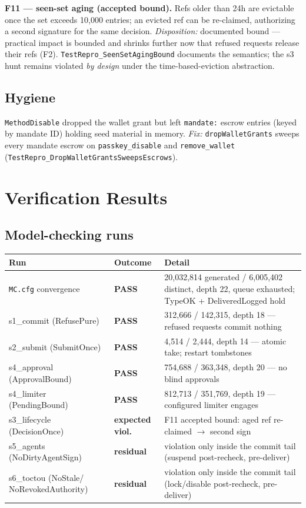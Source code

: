 \documentclass[11pt]{article}
\newcommand{\code}[1]{\texttt{#1}}
\begin{document}
\textbf{F11 — seen-set aging (accepted bound).} Refs older than 24h are
evictable once the set exceeds 10{,}000 entries; an evicted ref can be
re-claimed, authorizing a second signature for the same decision.
\emph{Disposition:} documented bound — practical impact is bounded and
shrinks further now that refused requests release their refs (F2).
\code{TestRepro\_SeenSetAgingBound} documents the semantics; the s3 hunt
remains violated \emph{by design} under the time-based-eviction abstraction.

\subsection{Hygiene}

\code{MethodDisable} dropped the wallet grant but left \code{mandate:} escrow
entries (keyed by mandate ID) holding seed material in memory. \emph{Fix:}
\code{dropWalletGrants} sweeps every mandate escrow on \code{passkey\_disable}
and \code{remove\_wallet}
(\code{TestRepro\_DropWalletGrantsSweepsEscrows}).

\section{Verification Results}

\subsection{Model-checking runs}

\begin{longtable}{@{}p{}p{}p{}@{}}
\toprule
\textbf{Run} & \textbf{Outcome} & \textbf{Detail} \\
\midrule
\endhead
\code{MC.cfg} convergence & \textbf{PASS} &
  20{,}032{,}814 generated / 6{,}005{,}402 distinct, depth 22, queue exhausted;
  TypeOK + DeliveredLogged hold \\
s1\_commit (RefusePure) & \textbf{PASS} &
  312{,}666 / 142{,}315, depth 18 — refused requests commit nothing \\
s2\_submit (SubmitOnce) & \textbf{PASS} &
  4{,}514 / 2{,}444, depth 14 — atomic take; restart tombstones \\
s4\_approval (ApprovalBound) & \textbf{PASS} &
  754{,}688 / 363{,}348, depth 20 — no blind approvals \\
s4\_limiter (PendingBound) & \textbf{PASS} &
  812{,}713 / 351{,}769, depth 19 — configured limiter engages \\
s3\_lifecycle (DecisionOnce) & \textbf{expected viol.} &
  F11 accepted bound: aged ref re-claimed $\to$ second sign \\
s5\_agents (NoDirtyAgentSign) & \textbf{residual} &
  violation only inside the commit tail (suspend post-recheck, pre-deliver) \\
s6\_toctou (NoStale/ NoRevokedAuthority) & \textbf{residual} &
  violation only inside the commit tail (lock/disable post-recheck, pre-deliver) \\
\bottomrule
\end{longtable}
\end{document}
